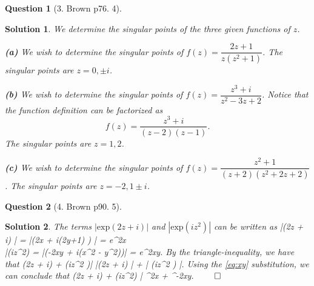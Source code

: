 \documentclass{article} %
\def\eQb#1\eQe{\begin{eqnarray*}#1\end{eqnarray*}}
\def\eQnb#1\eQne{\begin{eqnarray}#1\end{eqnarray}}
\theoremstyle{quest}
\newtheorem*{question}{Question}
\newtheorem*{solution}{Solution}
\begin{document}
\bigskip

\begin{question}[3. Brown p76. 4]
\end{question}
\begin{solution}
We determine the singular points of the three given functions of $z$.

\smallskip

\textbf{(a)} We wish to determine the singular points of $f(z) = \dfrac{2z + 1}{z(z^2+1)}$.
The singular points are $z = 0, \pm i$.
\smallskip

\textbf{(b)} We wish to determine the singular points of $f(z) = \dfrac{z^3 + i}{z^2 - 3z + 2}$.
Notice that the function definition can be factorized as
\[
f(z) = \dfrac{z^3 + i}{(z-2)(z-1)}.
\]
The singular points are $z = 1,2$.
\smallskip

\textbf{(c)} We wish to determine the singular points of $f(z) = \dfrac{z^2 + 1}{(z+2)
(z^2 + 2z + 2)}$. The singular points are $z=-2, 1 \pm i$. 


\end{solution}

\bigskip

\begin{question}[4. Brown p90. 5]
\end{question}
\begin{solution}
The terms $| \mathrm{exp}(2z + i) |$ and $| \mathrm{exp}(iz^2 )|$ can be written as
\eQnb \label{eq:xy}
|(2z + i) | = |(2x + i(2y+1) ) | = e^{2x} \\
|(iz^2) = |(-2xy + i(x^2 - y^2))| = e^{2xy}.
\eQne
By the triangle-inequality, we have that 
\eQb
|(2z + i) + (iz^2 )| \leq 
|(2z + i) | + | (iz^2 ) |. 
\eQe
Using the \ref{eq:xy} substitution, we can conclude that
\eQb
|(2z + i) + (iz^2) | \leq {}^{2x} + ^{-2xy}.
\eQe
$\qed$
\end{solution}

\pagebreak
\end{document}

